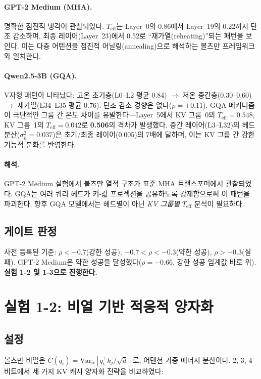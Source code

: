 \documentclass[11pt,a4paper]{article}
\begin{document}
\paragraph{GPT-2 Medium (MHA).}
명확한 점진적 냉각이 관찰되었다. $T_\mathrm{eff}$는 Layer~0의 0.86에서 Layer~19의 0.22까지 단조 감소하며, 최종 레이어(Layer~23)에서 0.52로 ``재가열(reheating)''되는 패턴을 보인다. 이는 다층 어텐션을 점진적 어닐링(annealing)으로 해석하는 볼츠만 프레임워크와 일치한다.

\paragraph{Qwen2.5-3B (GQA).}
V자형 패턴이 나타났다: 고온 초기층(L0--L2 평균 0.84) $\to$ 저온 중간층(0.30--0.60) $\to$ 재가열(L34--L35 평균 0.76). 단조 감소 경향은 없다($\rho = +0.11$).
GQA 메커니즘이 극단적인 그룹 간 온도 차이를 유발한다---Layer~5에서 KV 그룹~0의 $T_\mathrm{eff}=0.548$, KV 그룹~1의 $T_\mathrm{eff}=0.042$로 \textbf{0.506}의 격차가 발생했다. 중간 레이어(L3--L32)의 헤드 분산($\sigma^2_h = 0.037$)은 초기/최종 레이어(0.005)의 7배에 달하며, 이는 KV 그룹 간 강한 기능적 분화를 반영한다.

\paragraph{해석.}
GPT-2 Medium 실험에서 볼츠만 열적 구조가 표준 MHA 트랜스포머에서 관찰되었다. GQA는 여러 쿼리 헤드가 키-값 프로젝션을 공유하도록 강제함으로써 이 패턴을 파괴한다. 향후 GQA 모델에서는 헤드별이 아닌 \textit{KV 그룹별} $T_\mathrm{eff}$ 분석이 필요하다.

\subsection{게이트 판정}
사전 등록된 기준: $\rho < -0.7$(강한 성공), $-0.7 < \rho < -0.3$(약한 성공), $\rho > -0.3$(실패).
GPT-2 Medium은 \textcolor{partial}{약한 성공}을 달성했다($\rho = -0.66$, 강한 성공 임계값 바로 위).
\textbf{실험 1-2 및 1-3으로 진행한다.}

\section{실험 1-2: 비열 기반 적응적 양자화}

\subsection{설정}
볼츠만 비열은 $C(q_i) = \mathrm{Var}_\alpha[q_i^\top k_j / \sqrt{d}]$로, 어텐션 가중 에너지 분산이다. 2, 3, 4비트에서 세 가지 KV 캐시 양자화 전략을 비교하였다:
\end{document}

